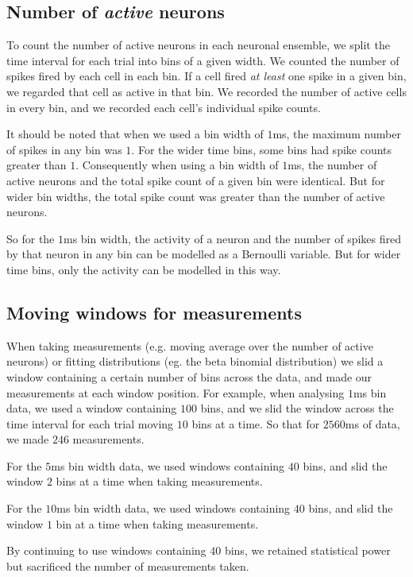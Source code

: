 \documentclass[a4paper,12pt]{article}
\theoremstyle{definition}
\begin{document}
    \subsection{Number of \textit{active} neurons}
    To count the number of active neurons in each neuronal ensemble, we split the time interval for each trial into bins of a given width. We counted the number of spikes fired by each cell in each bin. If a cell fired \textit{at least} one spike in a given bin, we regarded that cell as active in that bin. We recorded the number of active cells in every bin, and we recorded each cell's individual spike counts.

    It should be noted that when we used a bin width of $1$ms, the maximum number of spikes in any bin was $1$. For the wider time bins, some bins had spike counts greater than $1$. Consequently when using a bin width of $1$ms, the number of active neurons and the total spike count of a given bin were identical. But for wider bin widths, the total spike count was greater than the number of active neurons.

    So for the $1$ms bin width, the activity of a neuron and the number of spikes fired by that neuron in any bin can be modelled as a Bernoulli variable. But for wider time bins, only the activity can be modelled in this way.

    \subsection{Moving windows for measurements}

    When taking measurements (e.g. moving average over the number of active neurons) or fitting distributions (eg. the beta binomial distribution) we slid a window containing a certain number of bins across the data, and made our measurements at each window position. For example, when analysing $1$ms bin data, we used a window containing $100$ bins, and we slid the window across the time interval for each trial moving $10$ bins at a time. So that for $2560$ms of data, we made $246$ measurements.

    For the $5$ms bin width data, we used windows containing $40$ bins, and slid the window $2$ bins at a time when taking measurements.

    For the $10$ms bin width data, we used windows containing $40$ bins, and slid the window $1$ bin at a time when taking measurements.

    By continuing to use windows containing $40$ bins, we retained statistical power but sacrificed the number of measurements taken.
\end{document}
